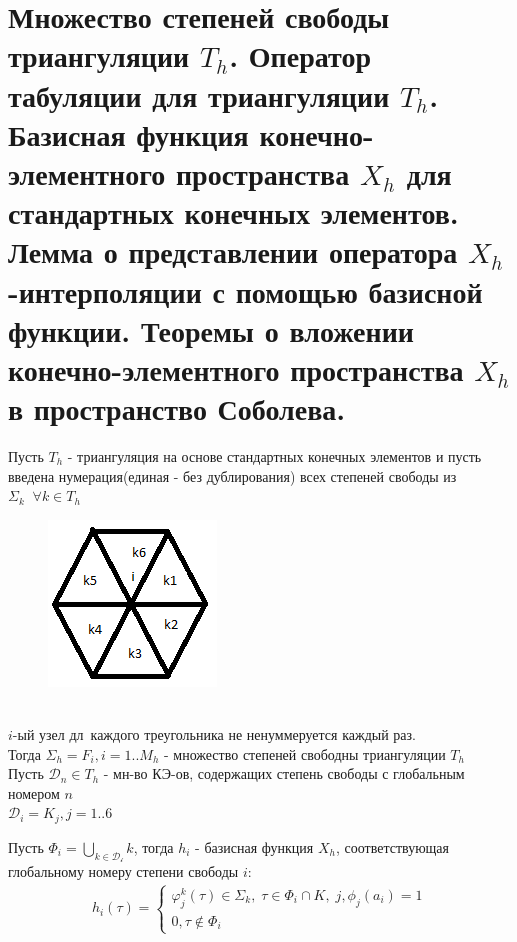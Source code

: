 \documentclass[__main__.tex]{subfiles}
\begin{document}
\section{Множество степеней свободы триангуляции $T_h$. Оператор табуляции для триангуляции $T_h$. Базисная функция конечно-элементного пространства $X_h$ для стандартных конечных элементов. Лемма о представлении оператора $X_h$ -интерполяции с помощью базисной функции. Теоремы о вложении конечно-элементного пространства $X_h$ в пространство Соболева.}

\begin{definition}
	Пусть $T_h$ - триангуляция на основе стандартных конечных элементов  и пусть введена нумерация(единая - без дублирования) всех степеней свободы из $\Sigma_k \;\; \forall k \in T_h$
\begin{figure}[h!]
	\centering
\includegraphics[width=0.4\linewidth]{14_1.png}
\end{figure}\\
$i$-ый узел дл\ каждого треугольника не ненуммеруется каждый раз. \\
Тогда $\Sigma_h = {F_i, i=1..M_h}$ - множество степеней свободны триангуляции $T_h$\\
Пусть $\mathcal{D}_n \in T_h$ - мн-во КЭ-ов, содержащих степень свободы с глобальным номером $n$\\
$\mathcal{D}_i = {K_j, j=1..6}$
\end{definition}

\begin{definition}
	Пусть $\Phi_i = \bigcup_{k \in \mathcal{D_i}}k$, тогда $h_i$ - базисная функция $X_h$, соответствующая глобальному номеру степени свободы $i$:
	\begin{gather*}
		h_i(\tau) =
		\begin{cases}
		\varphi_j^k(\tau)\in \Sigma_k, \; \tau \in \Phi_i \cap K, \; j, \phi_j(a_i)=1\\
		0, \tau \notin \Phi_i
		\end{cases}
	\end{gather*}
\end{definition}
\end{document}
